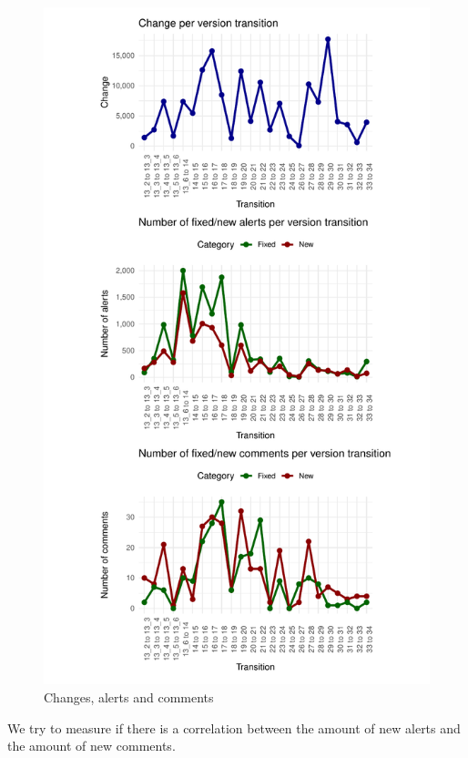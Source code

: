 \documentclass[
]{article}
\begin{document}
\begin{figure}
\centering
\includegraphics{report_files/figure-latex/unnamed-chunk-21-1.pdf}
\caption{\label{timeseries}Changes, alerts and comments}
\end{figure}

\normalsize

\newpage

We try to measure if there is a correlation between the amount of new
alerts and the amount of new comments.
\end{document}
